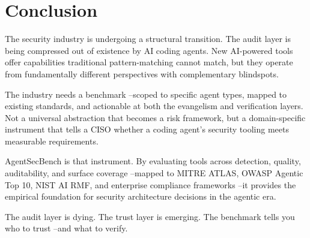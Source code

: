 \documentclass[11pt,twocolumn]{article}
\begin{document}
\section{Conclusion}

The security industry is undergoing a structural transition. The audit layer is being compressed out of existence by AI coding agents. New AI-powered tools offer capabilities traditional pattern-matching cannot match, but they operate from fundamentally different perspectives with complementary blindspots.

The industry needs a benchmark --scoped to specific agent types, mapped to existing standards, and actionable at both the evangelism and verification layers. Not a universal abstraction that becomes a risk framework, but a domain-specific instrument that tells a CISO whether a coding agent's security tooling meets measurable requirements.

AgentSecBench is that instrument. By evaluating tools across detection, quality, auditability, and surface coverage --mapped to MITRE ATLAS, OWASP Agentic Top 10, NIST AI RMF, and enterprise compliance frameworks --it provides the empirical foundation for security architecture decisions in the agentic era.

The audit layer is dying. The trust layer is emerging. The benchmark tells you who to trust --and what to verify.
\end{document}
